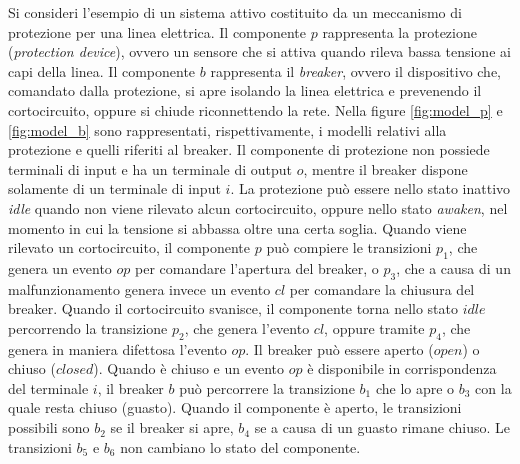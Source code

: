 \begin{ex}\label{ex:modelli}
Si consideri l'esempio di un sistema attivo costituito da un meccanismo di protezione per una linea elettrica. Il componente $p$ rappresenta la protezione (\emph{protection device}), ovvero un sensore che si attiva quando rileva bassa tensione ai capi della linea. Il componente $b$ rappresenta il \emph{breaker}, ovvero il dispositivo che, comandato dalla protezione, si apre isolando la linea elettrica e prevenendo il cortocircuito, oppure si chiude riconnettendo la rete. Nella figure \ref{fig:model_p} e \ref{fig:model_b}  sono rappresentati, rispettivamente, i modelli relativi alla protezione e quelli riferiti al breaker.
Il componente di protezione non possiede terminali di input e ha un terminale di output $o$, mentre il breaker dispone solamente di un terminale di input $i$.
La protezione può essere nello stato inattivo \emph{idle} quando non viene rilevato alcun cortocircuito, oppure nello stato \emph{awaken}, nel momento in cui la tensione si abbassa oltre una certa soglia. Quando viene rilevato un cortocircuito, il componente $p$ può compiere le transizioni $p_1$, che genera un evento $op$ per comandare l'apertura del breaker, o $p_3$, che a causa di un malfunzionamento genera invece un evento $cl$ per comandare la chiusura del breaker. Quando il cortocircuito svanisce, il componente torna nello stato $idle$ percorrendo la transizione $p_2$, che genera l'evento $cl$, oppure tramite $p_4$, che genera in maniera difettosa l'evento $op$.
Il breaker può essere aperto ($open$) o chiuso ($closed$). Quando è chiuso e un evento $op$ è disponibile in corrispondenza del terminale $i$, il breaker $b$ può percorrere la transizione $b_1$ che lo apre o $b_3$ con la quale resta chiuso (guasto). Quando il componente è aperto, le transizioni possibili sono $b_2$ se il breaker si apre, $b_4$ se a causa di un guasto rimane chiuso. Le transizioni $b_5$ e $b_6$ non cambiano lo stato del componente.

\end{ex}

